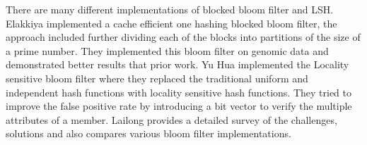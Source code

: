 \documentclass[letterpaper,10pt]{article}
\begin{document}
There are many different implementations of blocked bloom filter and LSH. Elakkiya \cite{1} implemented a cache efficient one hashing blocked bloom filter, the approach included further dividing each of the blocks into partitions of the size of a prime number. They implemented this bloom filter on genomic data and demonstrated better results that prior work. Yu Hua \cite{2} implemented the Locality sensitive bloom filter where they replaced the traditional uniform and independent hash functions with locality sensitive hash functions. They tried to improve the false positive rate by introducing a bit vector to verify the multiple attributes of a member. Lailong \cite{3} provides a detailed survey of the challenges, solutions and also compares various bloom filter implementations.
\printbibliography 
\end{document}
